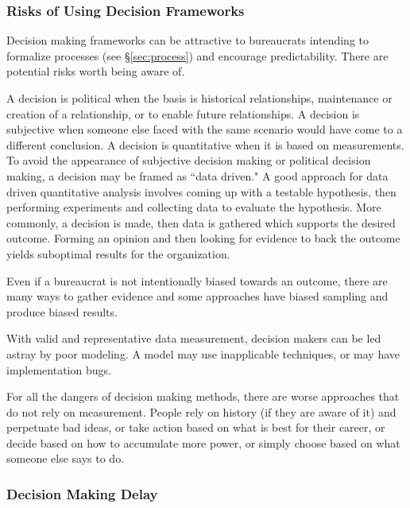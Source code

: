 \subsubsection{Risks of Using Decision Frameworks}

Decision making frameworks can be attractive to bureaucrats intending to formalize processes (see \S\ref{sec:process}) and encourage predictability. There are potential risks worth being aware of. 

A decision is political when the basis is historical relationships, maintenance or creation of a relationship, or to enable future relationships. A decision is subjective when someone else faced with the same scenario would have come to a different conclusion.
A decision is quantitative when it is based on measurements. To avoid the appearance of subjective decision making or political decision making, a decision may be framed as ``data driven." 
A good approach for data driven quantitative analysis involves coming up with a testable hypothesis, then performing experiments and collecting data to evaluate the hypothesis. More commonly, a decision is made, then data is gathered which supports the desired outcome. Forming an opinion and then looking for evidence to back the outcome yields suboptimal results for the organization.

Even if a bureaucrat is not intentionally biased towards an outcome, there are many ways to gather evidence and some approaches have biased sampling and produce biased results.

With valid and representative data measurement, decision makers can be led astray by poor modeling. A model may use inapplicable techniques, or may have implementation bugs.

For all the dangers of decision making methods, there are worse approaches that do not rely on measurement. People rely on history (if they are aware of it) and perpetuate bad ideas, or take action based on what is best for their career, or decide based on how to accumulate more power, or simply choose based on what someone else says to do.  


\subsubsection{Decision Making Delay\label{sec:decision-delay}}

